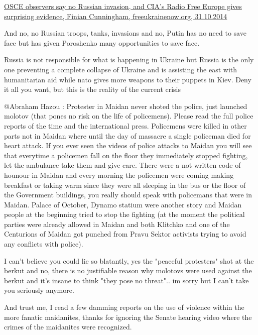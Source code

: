 \begin{itemize}
\begin{itemize}
\href{https://freeukrainenow.org/2014/12/05/osce-observers-say-no-russian-invasion-and-cias-radio-free-europe-gives-surprising-evidence/}{%
OSCE observers say no Russian invasion, and CIA’s Radio Free Europe gives surprising evidence, %
Finian Cunningham, freeukrainenow.org, 31.10.2014%
}

And no, no Russian troops, tanks, invasions and no, Putin has no need to save
face but has given Poroshenko many opportunities to save face.


Russia is not responsible for what is happening in Ukraine but Russia is the
only one preventing a complete collapse of Ukraine and is assisting the east
with humanitarian aid while nato gives more weapons to their puppets in Kiev.
Deny it all you want, but this is the reality of the current crisis


@Abraham Hazou : Protester in Maidan never shoted the police, just launched
molotov (that pones no risk on the life of policemens). Please read the full
police reports of the time and the international press. Policemens were killed
in other parts not in Maidan where until the day of massacre a single policeman
died for heart attack. If you ever seen the videos of police attacks to Maidan
you will see that everytime a policemen fall on the floor they immediately
stopped fighting, let the ambulance take them and give care. There were a not
written code of hounour in Maidan and every morning the policemen were coming
making breakfast or taking warm since they were all sleeping in the bus or the
floor of the Government buildings, you really should speak with policemans that
were in Maidan. Palace of October, Dynamo statium were another story and Maidan
people at the beginning tried to stop the fighting (at the moment the political
parties were already allowed in Maidan and both Klitchko and one of the
Centurions of Maidan got punched from Pravu Sektor activists trying to avoid
any conflicts with police).


I can't believe you could lie so blatantly, yes the "peaceful protesters" shot
at the berkut and no, there is no justifiable reason why molotovs were used
against the berkut and it's insane to think "they pose no threat".. im sorry
but I can't take you seriously anymore.


And trust me, I read a few damming reports on the use of violence within the
more fanatic maidanites, thanks for ignoring the Senate hearing video where the
crimes of the maidanites were recognized.


\end{itemize}
\end{itemize}
